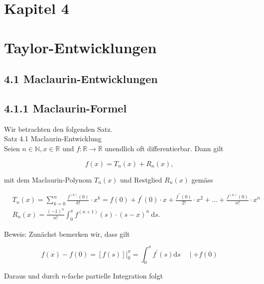 \documentclass[10pt]{article}
\begin{document}
\section*{Kapitel 4}
\section*{Taylor-Entwicklungen}
\subsection*{4.1 Maclaurin-Entwicklungen}
\subsection*{4.1.1 Maclaurin-Formel}
Wir betrachten den folgenden Satz.\\
Satz 4.1 Maclaurin-Entwicklung\\
Seien $n \in \mathbb{N}, x \in \mathbb{R}$ und $f: \mathbb{R} \rightarrow \mathbb{R}$ unendlich oft differentierbar. Dann gilt


\begin{equation*}
f(x)=T_{n}(x)+R_{n}(x), \tag{4.1}
\end{equation*}


mit dem Maclaurin-Polynom $T_{n}(x)$ und Restglied $R_{n}(x)$ gemäss


\begin{align*}
& T_{n}(x)=\sum_{k=0}^{n} \frac{f^{(k)}(0)}{k!} \cdot x^{k}=f(0)+f^{\prime}(0) \cdot x+\frac{f^{\prime \prime}(0)}{2!} \cdot x^{2}+\ldots+\frac{f^{(n)}(0)}{n!} \cdot x^{n}  \tag{4.2}\\
& R_{n}(x)=\frac{(-1)^{n}}{n!} \int_{0}^{x} f^{(n+1)}(s) \cdot(s-x)^{n} \mathrm{~d} s .
\end{align*}


Beweis: Zunächst bemerken wir, dass gilt


\begin{equation*}
f(x)-f(0)=\left.[f(s)]\right|_{0} ^{x}=\int_{0}^{x} f^{\prime}(s) \mathrm{d} s \quad \mid+f(0) \tag{4.3}
\end{equation*}


Daraus und durch $n$-fache partielle Integration folgt
\end{document}
